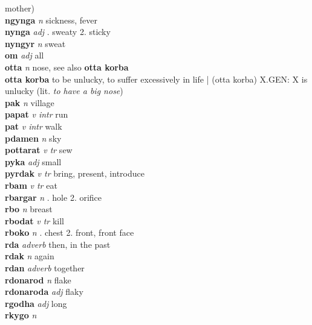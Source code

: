 mother)\\\textbf{ngynga}   \emph{n} \textperiodcentered sickness, fever\\\textbf{nynga}   \emph{adj} . sweaty 2. sticky \\\textbf{nyngyr}   \emph{n} \textperiodcentered sweat\\\textbf{om}   \emph{adj} \textperiodcentered all\\\textbf{otta}   \emph{n} \textperiodcentered nose, see also \textbf{otta korba}\\\textbf{otta korba}    \textperiodcentered to be unlucky, to suffer excessively in life | (otta korba) X.GEN: X is unlucky (lit. \emph{to have a big nose})\\\textbf{pak}   \emph{n} \textperiodcentered village\\\textbf{papat}   \emph{v intr} \textperiodcentered run\\\textbf{pat}   \emph{v intr} \textperiodcentered walk\\\textbf{pdamen}   \emph{n} \textperiodcentered sky\\\textbf{pottarat}   \emph{v tr} \textperiodcentered sew\\\textbf{pyka}   \emph{adj} \textperiodcentered small\\\textbf{pyrdak}   \emph{v tr} \textperiodcentered bring, present, introduce\\\textbf{rbam}   \emph{v tr} \textperiodcentered eat\\\textbf{rbargar}   \emph{n} . hole 2. orifice \\\textbf{rbo}   \emph{n} \textperiodcentered breast\\\textbf{rbodat}   \emph{v tr} \textperiodcentered kill\\\textbf{rboko}   \emph{n} . chest 2. front, front face \\\textbf{rda}   \emph{adverb} \textperiodcentered then, in the past\\\textbf{rdak}   \emph{n} \textperiodcentered again\\\textbf{rdan}   \emph{adverb} \textperiodcentered together\\\textbf{rdonarod}   \emph{n} \textperiodcentered flake\\\textbf{rdonaroda}   \emph{adj} \textperiodcentered flaky\\\textbf{rgodha}   \emph{adj} \textperiodcentered long\\\textbf{rkygo}   \emph{n} \textperiodcentered 